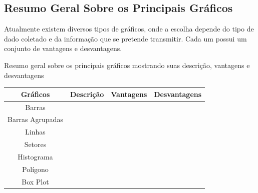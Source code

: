 \newpage
\subsection{Resumo Geral Sobre os Principais Gráficos}

\inic Atualmente existem diversos tipos de gráficos, onde a escolha depende do tipo de dado coletado e da informação que se pretende transmitir. Cada um possui um conjunto de vantagens e desvantagens.      

\begin{quadro}[h!tp]
    \centering
    \caption{Resumo geral sobre os principais gráficos mostrando suas descrição, vantagens e desvantagens}
    \begin{tabular}{|c|c|c|c|}
   \hline\hline
    Gráficos       & Descrição &  Vantagens & Desvantagens \\   
\hline\hline
  Barras           &           &           &             \\
  Barras Agrupadas &           &           &              \\
  Linhas           &           &           &              \\  
  Setores          &           &           &              \\
  Histograma       &           &           &              \\
  Polígono         &           &           &              \\
  Box Plot         &           &           &              \\
\hline\hline
\end{tabular}
\end{quadro}









